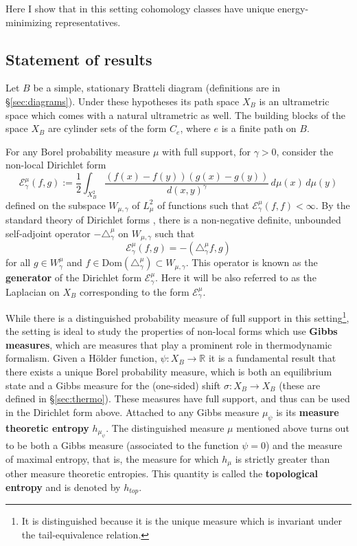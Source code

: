 \documentclass[12pt]{amsart}
\theoremstyle{plain}
\theoremstyle{definition}
\begin{document}
Here I show that in this setting cohomology classes have unique energy-minimizing representatives.

\subsection{Statement of results}
Let $B$ be a simple, stationary Bratteli diagram (definitions are in \S \ref{sec:diagrams}). Under these hypotheses its path space $X_B$ is an ultrametric space which comes with a natural ultrametric as well. The building blocks of the space $X_B$ are cylinder sets of the form $C_e$, where $e$ is a finite path on $B$.

For any Borel probability measure $\mu$ with full support, for $\gamma>0$, consider the non-local Dirichlet form
$$\mathcal{E}_\gamma^\mu(f,g):= \frac12 \int_{X^2_B} \frac{(f(x)-f(y))(g(x)-g(y))}{d(x,y)^\gamma}\, d\mu (x)\, d\mu (y)$$ 
defined on the subspace $W_{\mu,\gamma}$ of $L^2_\mu$ of functions such that $\mathcal{E}_\gamma^\mu(f,f)<\infty$. By the standard theory of Dirichlet forms \cite{FOT:DF}, there is a non-negative definite, unbounded self-adjoint operator $-\triangle_\gamma^\mu$ on $W_{\mu,\gamma} $ such that
$$\mathcal{E}^\mu_\gamma(f,g) = -(\triangle_\gamma^\mu f, g)$$
for all $g\in W^\mu_\gamma $ and $f\in \mathrm{Dom}(\triangle_\gamma^\mu)\subset W_{\mu,\gamma} $. This operator is known as the \textbf{generator} of the Dirichlet form $\mathcal{E}^\mu_\gamma$. Here it will be also referred to as the Laplacian on $X_B$ corresponding to the form $\mathcal{E}^\mu_\gamma$.

While there is a distinguished probability measure of full support in this setting\footnote{It is distinguished because it is the unique measure which is invariant under the tail-equivalence relation.}, the setting is ideal to study the properties of non-local forms which use \textbf{Gibbs measures}, which are measures that play a prominent role in thermodynamic formalism. Given a H\"older function, $\psi:X_B\rightarrow \mathbb{R}$ it is a fundamental result that there exists a unique Borel probability measure, which is both an equilibrium state and a Gibbs measure for the (one-sided) shift $\sigma:X_B\rightarrow X_B$ (these are defined in \S\ref{sec:thermo}). These measures have full support, and thus can be used in the Dirichlet form above. Attached to any Gibbs measure $\mu_\psi$ is its \textbf{measure theoretic entropy} $h_{\mu_\psi}$. The distinguished measure $\mu$ mentioned above turns out to be both a Gibbs measure (associated to the function $\psi = 0$) and the measure of maximal entropy, that is, the measure for which $h_\mu$ is strictly greater than other measure theoretic entropies. This quantity is called the \textbf{topological entropy} and is denoted by $h_{top}$.
\end{document}
